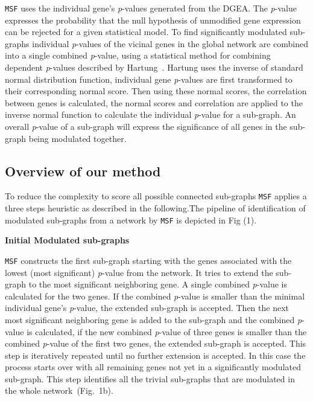 \documentclass[twocolumn]{article}
\begin{document}
\texttt{MSF} uses the individual gene's \textit{p}-values generated
from the DGEA. The \textit{p}-value
expresses the probability that the null hypothesis of unmodified gene
expression can be rejected for a given statistical model. To find
significantly modulated sub-graphs individual \textit{p}-values of the
vicinal genes in the global network are combined into a single
combined \textit{p}-value, using a statistical method for combining
dependent \textit{p}-values described by Hartung~\cite{Hartung}. Hartung uses the inverse of standard normal distribution function, individual gene \textit{p}-values are
first transformed to their corresponding normal score. Then using these normal scores, the correlation between genes is calculated, the normal scores and correlation are applied to
the inverse normal function to calculate the individual
\textit{p}-value for a sub-graph. An
overall \textit{p}-value of a sub-graph will express the significance
of all genes in the sub-graph being modulated together.


 
\subsection*{Overview of our method}

To reduce the complexity to score all possible connected sub-graphs
\texttt{MSF} applies a three steps heuristic as described in the
following.The pipeline of identification of modulated sub-graphs from a network by \texttt{MSF} is depicted in
Fig (1).
\newline

\textbf{Initial Modulated sub-graphs}

\texttt{MSF} constructs the first sub-graph starting with the genes
associated with the lowest (most significant) \textit{p}-value from
the network. It tries to extend the
sub-graph to the most significant neighboring gene. A single combined
\textit{p}-value is calculated for the two genes. If the combined
\textit{p}-value is smaller than the minimal individual gene's
\textit{p}-value, the extended sub-graph is accepted. Then the next most significant neighboring gene is added to the sub-graph and the combined \textit{p}-value is calculated, if the new combined \textit{p}-value of three genes is smaller than the combined \textit{p}-value of the first two genes, the extended sub-graph is accepted. This step is iteratively repeated until no further extension is accepted. In this case the process starts over with all remaining genes not yet in a
significantly modulated sub-graph. This step identifies all the trivial
sub-graphs that are modulated in the whole network~(Fig.~1b).\newline
\end{document}
